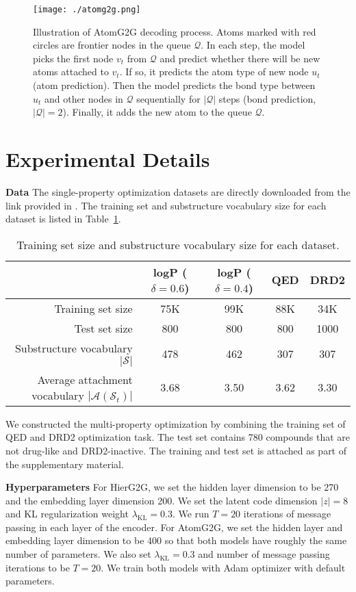 \documentclass{article} \usepackage{iclr2020_conference,times}
\def\gA{{\mathcal{A}}}
\def\gQ{{\mathcal{Q}}}
\def\gS{{\mathcal{S}}}
\begin{document}
\begin{figure}[t]
    \centering
    \texttt{[image: ./atomg2g.png]}
    \caption{Illustration of AtomG2G decoding process. Atoms marked with red circles are frontier nodes in the queue $\gQ$. In each step, the model picks the first node $v_t$ from $\gQ$ and predict whether there will be new atoms attached to $v_t$. If so, it predicts the atom type of new node $u_t$ (atom prediction). Then the model predicts the bond type between $u_t$ and other nodes in $\gQ$ sequentially for $|\gQ|$ steps (bond prediction, $|\gQ|=2$). Finally, it adds the new atom to the queue $\gQ$.}
    \label{fig:atomg2g}
\end{figure}

\section{Experimental Details}

\textbf{Data } The single-property optimization datasets are directly downloaded from the link provided in \citet{jin2018learning}. The training set and substructure vocabulary size for each dataset is listed in Table~\ref{tab:data}.
\begin{table}[ht]
    \centering
    \begin{tabular}{rcccc}
        \hline
        & logP ($\delta=0.6$) & logP ($\delta=0.4$) & QED & DRD2 \Tstrut\Bstrut \\
        \hline
        Training set size & 75K & 99K & 88K & 34K \Tstrut\Bstrut \\
        Test set size & 800 & 800 & 800 & 1000 \Tstrut\Bstrut \\
        Substructure vocabulary $|\gS|$ & 478 & 462 & 307 & 307 \Tstrut\Bstrut \\
        Average attachment vocabulary $|\gA(\gS_t)|$ & 3.68 & 3.50 & 3.62 & 3.30 \Tstrut\Bstrut \\ \hline
    \end{tabular}
    \caption{Training set size and substructure vocabulary size for each dataset.}
    \label{tab:data}
\end{table}
We constructed the multi-property optimization by combining the training set of QED and DRD2 optimization task. The test set contains 780 compounds that are not drug-like and DRD2-inactive. The training and test set is attached as part of the supplementary material.

\textbf{Hyperparameters } For HierG2G, we set the hidden layer dimension to be 270 and the embedding layer dimension 200. We set the latent code dimension $|z|=8$ and KL regularization weight $\lambda_{\textrm{KL}}=0.3$. We run $T=20$ iterations of message passing in each layer of the encoder. 
For AtomG2G, we set the hidden layer and embedding layer dimension to be 400 so that both models have roughly the same number of parameters. We also set $\lambda_{\textrm{KL}}=0.3$ and number of message passing iterations to be $T=20$. We train both models with Adam optimizer with default parameters.
\end{document}
